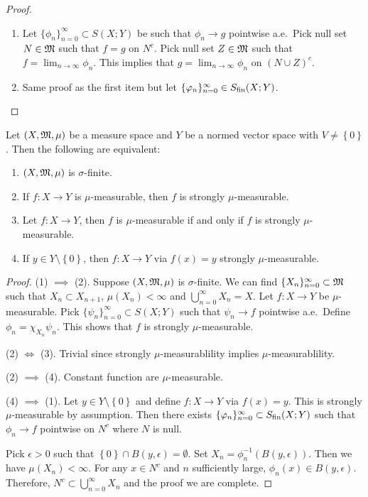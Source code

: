 \documentclass[a4paper]{article}
\renewcommand{\cupinfn}{\bigcup_{n=0}^\infty}
\renewcommand{\seqinfn}[1]{\{ #1 \}_{n=0}^\infty}
\begin{document}
\begin{proof}
  \begin{enumerate}
    \item Let $\seqinfn{\phi_n} \subset S(X; Y)$ be such that $\phi_n \to
          g$ pointwise a.e.\ Pick null set $N \in \mathfrak{M}$ such that $f = g$
          on $N^c$. Pick null set $Z \in \mathfrak{M}$ such that $f = \lim_{n \to
          \infty} \phi_n$. This implies that $g = \lim_{n \to \infty}
          \phi_n$ on $(N \cup Z)^c$.

    \item Same proof as the first item but let $\seqinfn{\phi_n} \in
          \Sfin(X; Y)$.
  \end{enumerate}

\end{proof}

\begin{thm}
  Let $(X,\mathfrak{M}, \mu)$ be a measure space and $Y$ be a normed vector space
  with $V \neq \left\{ 0 \right\}$. Then the following are equivalent:
  \begin{enumerate}
    \item $(X, \mathfrak{M}, \mu)$ is $\sigma$-finite.
    \item If $f: X \to Y$ is $\mu$-measurable, then $f$ is strongly
          $\mu$-measurable.
    \item Let $f: X \to Y$, then $f$ is $\mu$-measurable if and only if
          $f$ is strongly $\mu$-measurable.
    \item If $y \in Y \setminus \left\{ 0 \right\}$, then $f: X \to Y$ via
          $f(x) = y$ strongly $\mu$-measurable.
  \end{enumerate}
\end{thm}

\begin{proof}
  (1) $\implies$ (2). Suppose $(X, \mathfrak{M}, \mu)$ is
  $\sigma$-finite. We can find $\seqinfn{X_n}
    \subset \mf$ such that $X_n \subset X_{n+1}$,
  $\mu(X_n) < \infty$ and $\cupinfn X_n = X$.
  Let $f: X \to Y$ be $\mu$-measurable. Pick
  $\seqinfn{\psi_n} \subset S(X; Y)$ such that
  $\psi_n \to f$ pointwise a.e.\ Define
  $\phi_n = \chi_{X_n} \psi_n$. This shows that
  $f$ is strongly $\mu$-measurable.

  (2) $\iff$ (3). Trivial since strongly $\mu$-measurablility
  implies $\mu$-measurablility.

  (2) $\implies$ (4). Constant function are $\mu$-measurable.

  (4) $\implies$ (1). Let $y \in Y \setminus \left\{ 0 \right\}$
  and define $f : X \to Y$ via $f(x) = y$. This
  is strongly $\mu$-measurable by assumption.
  Then there exists $\seqinfn{\phi_n} \subset \Sfin(X; Y)$
  such that $\phi_n \to f$ pointwise on $N^c$ where
  $N$ is null.

  Pick $\epsilon > 0$ such that $\left\{ 0 \right\} \cap B(y, \epsilon) =
  \emptyset$. Set $X_n = \phi_n^{-1} (B(y, \epsilon))$. Then we have
  $\mu(X_n) < \infty$. For any $x \in N^c$ and $n$ sufficiently large,
  $\phi_n(x) \in B(y, \epsilon)$. Therefore, $N^c \subset \cupinfn X_n$
  and the proof we are complete.

\end{proof}
\end{document}

